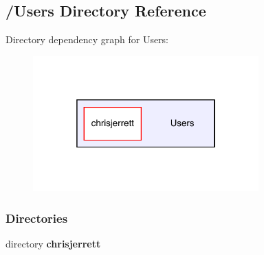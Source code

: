 \subsection{/\+Users Directory Reference}
\label{dir_d522931ffa1371640980b621734a4381}
Directory dependency graph for Users\+:
\nopagebreak
\begin{figure}[H]
\begin{center}
\leavevmode
\includegraphics[width=246pt]{dir_d522931ffa1371640980b621734a4381_dep}
\end{center}
\end{figure}
\subsubsection*{Directories}
\begin{DoxyCompactItemize}
\item 
directory \textbf{ chrisjerrett}
\end{DoxyCompactItemize}

